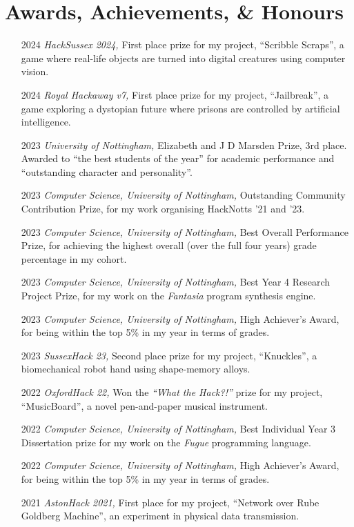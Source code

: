 \documentclass[12pt]{article}
\begin{document}
\section*{Awards, Achievements, \& Honours}
\begin{itemize}
	\item[2024] \textit{HackSussex 2024,} First place prize for my project, ``Scribble Scraps'', a game where real-life objects are turned into digital creatures using computer vision.
	\item[2024] \textit{Royal Hackaway v7,} First place prize for my project, ``Jailbreak'', a game exploring a dystopian future where prisons are controlled by artificial intelligence.
	\item[2023] \textit{University of Nottingham,} Elizabeth and J D Marsden Prize, 3rd place. Awarded to ``the best students of the year'' for academic performance and ``outstanding character and personality''.
	\item[2023] \textit{Computer Science, University of Nottingham,} Outstanding Community Contribution Prize, for my work organising HackNotts '21 and '23.
	\item[2023] \textit{Computer Science, University of Nottingham,} Best Overall Performance Prize, for achieving the highest overall (over the full four years) grade percentage in my cohort.
	\item[2023] \textit{Computer Science, University of Nottingham,} Best Year 4 Research Project Prize, for my work on the \textit{Fantasia} program synthesis engine.
	\item[2023] \textit{Computer Science, University of Nottingham,} High Achiever's Award, for being within the top 5\% in my year in terms of grades.
	\item[2023] \textit{SussexHack 23,} Second place prize for my project, ``Knuckles'', a biomechanical robot hand using shape-memory alloys.
	\item[2022] \textit{OxfordHack 22,} Won the \textit{``What the Hack?!''} prize for my project, ``MusicBoard'', a novel pen-and-paper musical instrument.
	\item[2022] \textit{Computer Science, University of Nottingham,} Best Individual Year 3 Dissertation prize for my work on the \textit{Fugue} programming language.
	\item[2022] \textit{Computer Science, University of Nottingham,} High Achiever's Award, for being within the top 5\% in my year in terms of grades.
	\item[2021] \textit{AstonHack 2021,} First place for my project, ``Network over Rube Goldberg Machine'', an experiment in physical data transmission.

\end{itemize}
\end{document}
